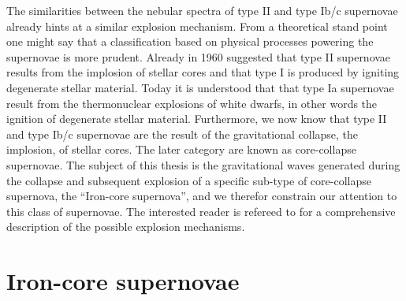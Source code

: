 The similarities between the nebular spectra of type II and type Ib/c supernovae already hints at a similar 
explosion mechanism. From a theoretical stand point one might say that a classification based on physical processes
powering the supernovae is more prudent. Already in 1960 \cite{hoyle_60} suggested that type II supernovae results from
the implosion of stellar cores and that type I is produced by igniting degenerate stellar material. Today it is understood that
that type Ia supernovae result from the thermonuclear explosions of white dwarfs, in other words the ignition of degenerate stellar material.
Furthermore, we now know that type II and type Ib/c supernovae are the result of the gravitational collapse, the implosion, of stellar cores.
The later category are known as core-collapse supernovae. The subject of this thesis is the gravitational waves generated during the 
collapse and subsequent explosion of a specific sub-type of core-collapse supernova, the ``Iron-core supernova'', and we therefor 
constrain our attention to this class of supernovae. The interested reader is refereed to \cite{janka_12} for a comprehensive description 
of the possible explosion mechanisms.

\section{Iron-core supernovae}
